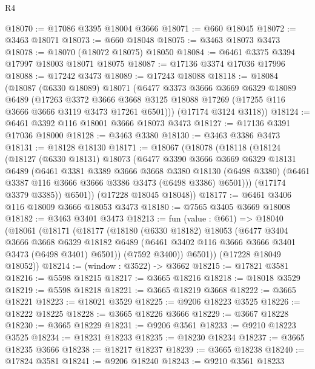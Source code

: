 \begin{lexlean}{R4}
\begin{coremodule}
@18070 := @17086 @3395 @18004 @3666
@18071 := @660 @18045
@18072 := @3463 @18071
@18073 := @660 @18048
@18075 := @3463 @18073 @3473
@18078 := @18070 (@18072 @18075) @18050
@18084 := @6461 @3375 @3394 @17997 @18003 @18071 @18075
@18087 := @17136 @3374 @17036 @17996
@18088 := @17242 @3473
@18089 := @17243 @18088
@18118 := @18084
    (@18087
      (@6330 @18089)
      @18071
      (@6477
        @3373
        @3666
        @3669
        @6329
        @18089
        @6489
        (@17263
          @3372
          @3666
          @3668
          @3125
          @18088
          @17269
          (@17255 @116 @3666 @3666 @3119 @3473 @17261 @6501)))
      (@17174 @3124 @3118))
@18124 := @6461 @3392 @116 @18001 @3666 @18073 @3473
@18127 := @17136 @3391 @17036 @18000
@18128 := @3463 @3380
@18130 := @3463 @3386 @3473
@18131 := @18128 @18130
@18171 := @18067
    (@18078
      (@18118
        (@18124
          (@18127
            (@6330 @18131)
            @18073
            (@6477
              @3390
              @3666
              @3669
              @6329
              @18131
              @6489
              (@6461
                @3381
                @3389
                @3666
                @3668
                @3380
                @18130
                (@6498 @3380)
                (@6461 @3387 @116 @3666 @3666 @3386 @3473 (@6498 @3386) @6501)))
            (@17174 @3379 @3385))
          @6501))
      (@17228 @18045 @18048))
@18177 := @6461 @3406 @116 @18009 @3666 @18053 @3473
@18180 := @7565 @3405 @3669 @18008
@18182 := @3463 @3401 @3473
@18213 := fun (value : @661) =>
  @18040
    (@18061
      (@18171
        (@18177
          (@18180
            (@6330 @18182)
            @18053
            (@6477
              @3404
              @3666
              @3668
              @6329
              @18182
              @6489
              (@6461 @3402 @116 @3666 @3666 @3401 @3473 (@6498 @3401) @6501))
            (@7592 @3400))
          @6501))
      (@17228 @18049 @18052))
@18214 := (window : @3522) -> @3662
@18215 := @17821 @3581
@18216 := @5598 @18215
@18217 := @3665 @18216
@18218 := @18018 @3529
@18219 := @5598 @18218
@18221 := @3665 @18219 @3668
@18222 := @3665 @18221
@18223 := @18021 @3529
@18225 := @9206 @18223 @3525
@18226 := @18222 @18225
@18228 := @3665 @18226 @3666
@18229 := @3667 @18228
@18230 := @3665 @18229
@18231 := @9206 @3561
@18233 := @9210 @18223 @3525
@18234 := @18231 @18233
@18235 := @18230 @18234
@18237 := @3665 @18235 @3666
@18238 := @18217 @18237
@18239 := @3665 @18238
@18240 := @17824 @3581
@18241 := @9206 @18240
@18243 := @9210 @3561 @18233

\end{coremodule}
\end{lexlean}
